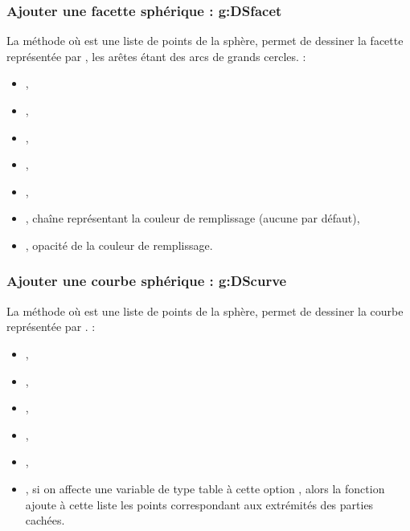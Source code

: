 \subsubsection{Ajouter une facette sphérique : g:DSfacet}

La méthode  où  est une liste de points de la sphère, permet de dessiner la facette représentée par , les arêtes étant des arcs de grands cercles. \writeoptions :
    \begin{itemize}
        \item {}, 
        \item {},
        \item {},
        \item {},
        \item {},
        \item {}, chaîne représentant la couleur de remplissage (aucune par défaut),
        \item {}, opacité de la couleur de remplissage.
    \end{itemize}
    
\subsubsection{Ajouter une courbe sphérique : g:DScurve}

La méthode  où  est une liste de points de la sphère, permet de dessiner la courbe représentée par . \writeoptions :
    \begin{itemize}
        \item {}, 
        \item {},
        \item {},
        \item {},
        \item {},
        \item {}, si on affecte une variable de type table à cette option , alors la fonction ajoute à cette liste les points correspondant aux extrémités des parties cachées.
    \end{itemize}
    
